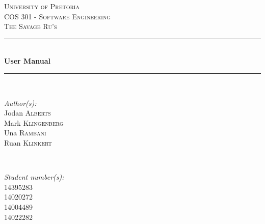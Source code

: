 \documentclass[a4paper,12pt]{article}
\begin{document}
\begin{titlepage}

\newcommand{\HRule}{\rule{\linewidth}{0.5mm}} %

\center %
 

\textsc{\LARGE University of Pretoria}\\[1.5cm]
\textsc{\Large COS 301 - Software Engineering}\\[0.5cm]
\textsc{\large The Savage Ru's}\\[0.5cm]


\HRule \\[0.4cm]
{ \huge \bfseries User Manual}\\ %
\HRule \\[1.5cm]
 

\begin{minipage}{0.4\textwidth}
\begin{flushleft} \large
\emph{Author(s):}\\
Jodan \textsc{Alberts}\\ %
Mark \textsc{Klingenberg}\\
Una \textsc{Rambani}\\
Ruan \textsc{Klinkert}\\
\end{flushleft}
\end{minipage}
~
\begin{minipage}{0.4\textwidth}
\begin{flushright} \large
\emph{Student number(s):} \\
14395283\\ %
14020272\\
14004489\\
14022282\\


\end{flushright}
\end{minipage}
\end{titlepage}
\end{document}
